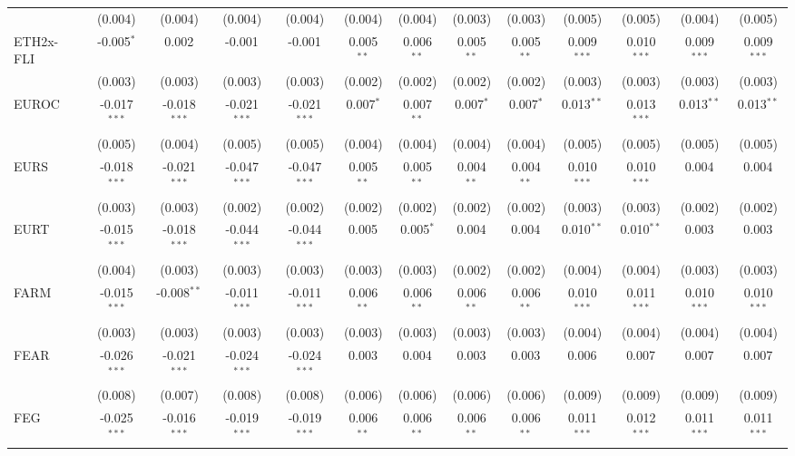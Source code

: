 \begin{table}[!htbp]
\begin{tabular}{@{\extracolsep{5pt}}lcccccccccccc}
  & (0.004) & (0.004) & (0.004) & (0.004) & (0.004) & (0.004) & (0.003) & (0.003) & (0.005) & (0.005) & (0.004) & (0.005) \\
 ETH2x-FLI & -0.005$^{*}$ & 0.002$^{}$ & -0.001$^{}$ & -0.001$^{}$ & 0.005$^{**}$ & 0.006$^{**}$ & 0.005$^{**}$ & 0.005$^{**}$ & 0.009$^{***}$ & 0.010$^{***}$ & 0.009$^{***}$ & 0.009$^{***}$ \\
  & (0.003) & (0.003) & (0.003) & (0.003) & (0.002) & (0.002) & (0.002) & (0.002) & (0.003) & (0.003) & (0.003) & (0.003) \\
 EUROC & -0.017$^{***}$ & -0.018$^{***}$ & -0.021$^{***}$ & -0.021$^{***}$ & 0.007$^{*}$ & 0.007$^{**}$ & 0.007$^{*}$ & 0.007$^{*}$ & 0.013$^{**}$ & 0.013$^{***}$ & 0.013$^{**}$ & 0.013$^{**}$ \\
  & (0.005) & (0.004) & (0.005) & (0.005) & (0.004) & (0.004) & (0.004) & (0.004) & (0.005) & (0.005) & (0.005) & (0.005) \\
 EURS & -0.018$^{***}$ & -0.021$^{***}$ & -0.047$^{***}$ & -0.047$^{***}$ & 0.005$^{**}$ & 0.005$^{**}$ & 0.004$^{**}$ & 0.004$^{**}$ & 0.010$^{***}$ & 0.010$^{***}$ & 0.004$^{}$ & 0.004$^{}$ \\
  & (0.003) & (0.003) & (0.002) & (0.002) & (0.002) & (0.002) & (0.002) & (0.002) & (0.003) & (0.003) & (0.002) & (0.002) \\
 EURT & -0.015$^{***}$ & -0.018$^{***}$ & -0.044$^{***}$ & -0.044$^{***}$ & 0.005$^{}$ & 0.005$^{*}$ & 0.004$^{}$ & 0.004$^{}$ & 0.010$^{**}$ & 0.010$^{**}$ & 0.003$^{}$ & 0.003$^{}$ \\
  & (0.004) & (0.003) & (0.003) & (0.003) & (0.003) & (0.003) & (0.002) & (0.002) & (0.004) & (0.004) & (0.003) & (0.003) \\
 FARM & -0.015$^{***}$ & -0.008$^{**}$ & -0.011$^{***}$ & -0.011$^{***}$ & 0.006$^{**}$ & 0.006$^{**}$ & 0.006$^{**}$ & 0.006$^{**}$ & 0.010$^{***}$ & 0.011$^{***}$ & 0.010$^{***}$ & 0.010$^{***}$ \\
  & (0.003) & (0.003) & (0.003) & (0.003) & (0.003) & (0.003) & (0.003) & (0.003) & (0.004) & (0.004) & (0.004) & (0.004) \\
 FEAR & -0.026$^{***}$ & -0.021$^{***}$ & -0.024$^{***}$ & -0.024$^{***}$ & 0.003$^{}$ & 0.004$^{}$ & 0.003$^{}$ & 0.003$^{}$ & 0.006$^{}$ & 0.007$^{}$ & 0.007$^{}$ & 0.007$^{}$ \\
  & (0.008) & (0.007) & (0.008) & (0.008) & (0.006) & (0.006) & (0.006) & (0.006) & (0.009) & (0.009) & (0.009) & (0.009) \\
 FEG & -0.025$^{***}$ & -0.016$^{***}$ & -0.019$^{***}$ & -0.019$^{***}$ & 0.006$^{**}$ & 0.006$^{**}$ & 0.006$^{**}$ & 0.006$^{**}$ & 0.011$^{***}$ & 0.012$^{***}$ & 0.011$^{***}$ & 0.011$^{***}$ \\

\end{tabular}
\end{table}
